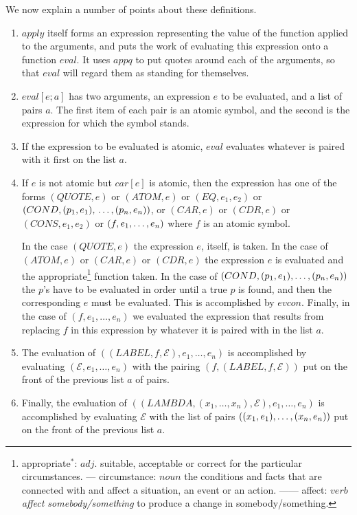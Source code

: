\documentclass[11pt, a4paper]{article}
\begin{document}
We now explain a number of points about these definitions.
\begin{enumerate}
\item $apply$ itself forms an expression representing the value of the function
  applied to the arguments, and puts the work of evaluating this expression onto
  a function $eval$. It uses $appq$ to put quotes around each of the arguments,
  so that $eval$ will regard them as standing for themselves.
\item $eval[e; a]$ has two arguments, an expression $e$ to be evaluated, and a
  list of pairs $a$. The first item of each pair is an atomic symbol, and the
  second is the expression for which the symbol stands.
\item If the expression to be evaluated is atomic, $eval$ evaluates whatever is
  paired with it first on the list $a$.
\item If $e$ is not atomic but $car[e]$ is atomic, then the expression has one
  of the forms $(QUOTE, e)$ or $(ATOM, e)$ or $(EQ, e_1, e_2)$ or $(COND, (p_1,
  e_1),\\\ldots, (p_n, e_n))$, or $(CAR, e)$ or $(CDR, e)$ or $(CONS, e_1, e_2)$
  or $(f, e_1, \ldots,\\e_n)$ where $f$ is an atomic symbol.

  In the case $(QUOTE, e)$ the expression $e$, itself, is taken. In the case of
  $(ATOM, e)$ or $(CAR, e)$ or $(CDR, e)$ the expression $e$ is evaluated and
  the
  appropriate\footnote{appropriate$^*$: $adj.$ suitable, acceptable or correct
    for the particular circumstances. --- circumstance: $noun$ the conditions
    and facts that are connected with and affect a situation, an event or an
    action. ------ affect: $verb$ \textit{affect somebody/something} to produce
    a change in somebody/something.}
  function taken. In the case of $(COND, (p_1, e_1), \ldots,\\(p_n, e_n))$ the
  $p$'s have to be evaluated in order until a true $p$ is found, and then the
  corresponding $e$ must be evaluated. This is accomplished by $evcon$. Finally,
  in the case of $(f, e_1, \ldots, e_n)$ we evaluated the expression that
  results from replacing $f$ in this expression by whatever it is paired with in
  the list $a$.
\item The evaluation of $((LABEL, f, \mathcal{E}), e_1, \ldots, e_n)$ is
  accomplished by evaluating $(\mathcal{E}, e_1, \ldots, e_n)$ with the pairing
  $(f, (LABEL, f, \mathcal{E}))$ put on the front of the previous list $a$ of
  pairs.
\item Finally, the evaluation of $((LAMBDA, (x_1, \ldots, x_n), \mathcal{E}),
  e_1, \ldots, e_n)$ is accomplished by evaluating $\mathcal{E}$ with the list
  of pairs $((x_1, e_1), \ldots, (x_n, e_n)\\)$ put on the front of the previous
  list $a$.


\end{enumerate}
\end{document}

